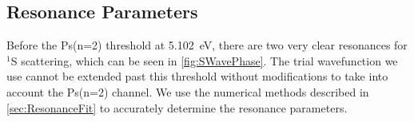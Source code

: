 \documentclass[Dissertation.tex]{subfiles}
\begin{document}
\subsection{Resonance Parameters}
\label{sec:SWaveResonances}

Before the Ps(n=2) threshold at \SI{5.102}{eV}, 
there are two very clear resonances for $^1$S scattering, which can be seen 
in \cref{fig:SWavePhase}. %
The trial wavefunction we use cannot be 
extended past this threshold without modifications to take into account the
Ps(n=2) channel. We use the numerical methods described in
\cref{sec:ResonanceFit} to accurately determine the resonance parameters.

\setlength{\abovecaptionskip}{6pt}   %
\setlength{\belowcaptionskip}{6pt}   %
\end{document}
